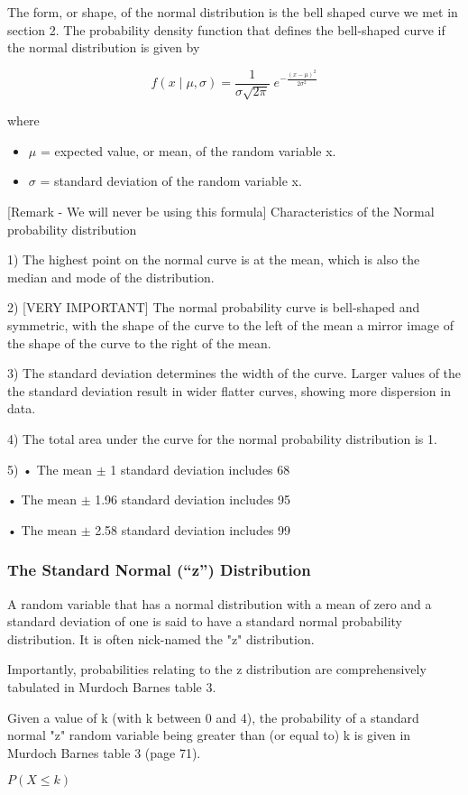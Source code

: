 \begin{frame}
The form, or shape, of the normal distribution is the bell shaped curve we met in section 2.
The probability density function that defines the bell-shaped curve if the normal distribution is given by




\[f(x \; | \; \mu, \sigma) = \frac{1}{\sigma\sqrt{2\pi} } \; e^{ -\frac{(x-\mu)^2}{2\sigma^2} }\]

where 

\begin{itemize}
 \item $\mu$ = expected value, or mean, of the random variable x.
 \item $\sigma$  = standard deviation of the random variable x.
\end{itemize}
[Remark - We will never be using this formula]
Characteristics of the Normal probability distribution

1) The highest point on the normal curve is at the mean, which is also the median and mode of the distribution.


2) [VERY IMPORTANT]
The normal probability curve is bell-shaped and symmetric, with the shape of the curve to the left of the mean a mirror image of the shape of the curve to the right of the mean.

3) The standard deviation determines the width of the curve. Larger values of the the standard deviation result in wider flatter curves, showing more dispersion in data.


4) The total area under the curve for the normal probability distribution is 1.

5)
•	The mean $\pm$  1 standard deviation includes 68%

•	The mean $\pm$  1.96 standard deviation includes 95%
   
•	The mean $\pm$  2.58 standard deviation includes 99%


\frametitle{The Standard Normal (“z”) Distribution}
 
A random variable that has a normal distribution with a mean of zero and a standard deviation of one is said to have a standard normal probability distribution.  It is often nick-named the "z" distribution.
 
Importantly, probabilities relating to the z distribution are comprehensively tabulated in Murdoch Barnes table 3.

Given a value of k (with k between 0 and 4), the probability of a  standard normal "z" random variable being greater than (or equal to) k is given in Murdoch Barnes table 3 (page 71). 

$P(X \leq k)$

\end{frame}
